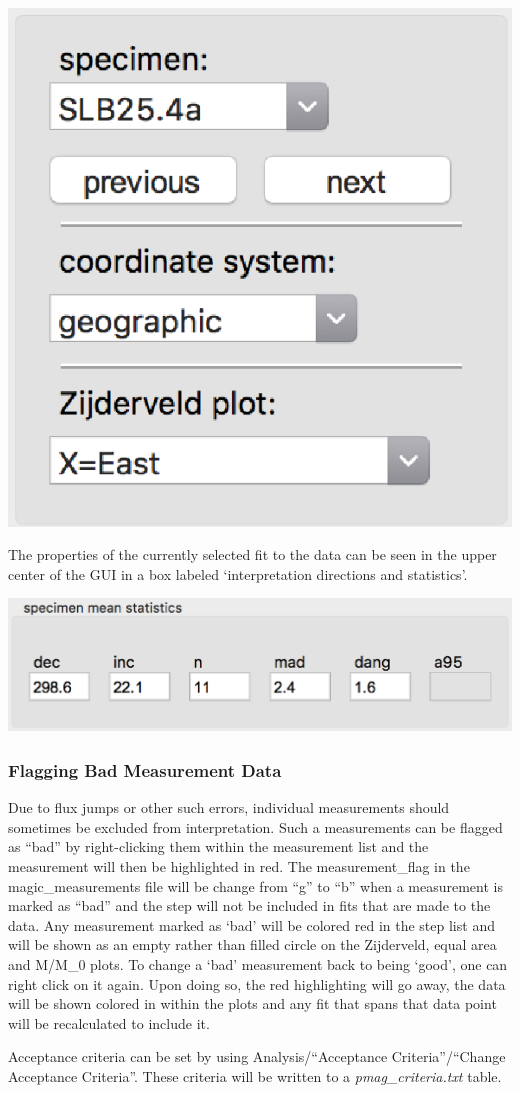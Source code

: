 \documentclass[11pt]{book}
\begin{document}
\includegraphics[width=5 cm]{EPSfiles/demag_gui_ProjectionChoice.eps}

The properties of the currently selected fit to the data can be seen in the upper center of the GUI in a box labeled `interpretation directions and statistics'.

\includegraphics[width=15 cm]{EPSfiles/demag_gui_FitData.eps}

\subsubsection{Flagging Bad Measurement
Data}\label{flagging-bad-measurement-data}

Due to flux jumps or other such errors, individual measurements should sometimes be excluded from interpretation. Such a measurements can be flagged as ``bad'' by right-clicking them within the measurement list and the measurement will then be highlighted in red. The measurement\_flag in the magic\_measurements file will be change from ``g'' to ``b'' when a measurement is marked as ``bad'' and the step will not be included in fits that are made to the data. Any measurement marked as `bad' will be colored red in the step list and will be shown as an empty rather than filled circle on the Zijderveld, equal area and M/M\_0 plots. To change a `bad' measurement back to being `good', one can right click on it again. Upon doing so, the red highlighting will go away, the data will be shown colored in within the plots and any fit that spans that data point will be recalculated to include it.

Acceptance criteria can be set by using Analysis/``Acceptance
Criteria''/``Change Acceptance Criteria''. These criteria will be written to a {\it pmag\_criteria.txt}  table.
\end{document}
